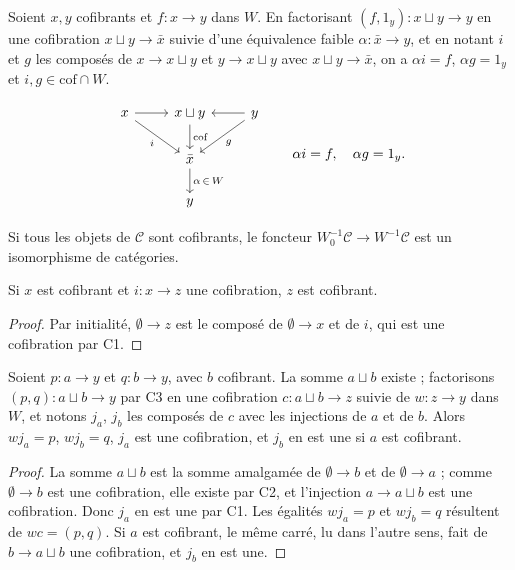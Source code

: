\begin{enonce}
Soient $x, y$ cofibrants et $f : x \to y$ dans $W$. En factorisant $(f, 1_y) : x \sqcup y \to y$ en une cofibration $x \sqcup y \to \bar x$ suivie d'une équivalence faible $\alpha : \bar x \to y$, et en notant $i$ et $g$ les composés de $x \to x \sqcup y$ et $y \to x \sqcup y$ avec $x \sqcup y \to \bar x$, on a $\alpha i = f$, $\alpha g = 1_y$ et $i, g \in \mathrm{cof} \cap W$.
\end{enonce}

\[
\begin{tikzcd}
x \arrow[r] \arrow[rd, "i"'] & x \sqcup y \arrow[d, "\mathrm{cof}"] & y \arrow[l] \arrow[ld, "g"] \\
& \bar x \arrow[d, "\alpha\, \in\, W"] & \\
& y &
\end{tikzcd}
\qquad \alpha i = f, \quad \alpha g = 1_y.
\]

\begin{enonce}
Si tous les objets de $\mathcal C$ sont cofibrants, le foncteur $W_0^{-1}\mathcal C \to W^{-1}\mathcal C$ est un isomorphisme de catégories.
\end{enonce}

\begin{lemme}\label{lem:106-cof}
Si $x$ est cofibrant et $i : x \to z$ une cofibration, $z$ est cofibrant.
\end{lemme}

\begin{proof}
Par initialité, $\emptyset \to z$ est le composé de $\emptyset \to x$ et de $i$, qui est une cofibration par C1.
\end{proof}

\begin{lemme}\label{lem:106-somme}
Soient $p : a \to y$ et $q : b \to y$, avec $b$ cofibrant. La somme $a \sqcup b$ existe ; factorisons $(p, q) : a \sqcup b \to y$ par C3 en une cofibration $c : a \sqcup b \to z$ suivie de $w : z \to y$ dans $W$, et notons $j_a$, $j_b$ les composés de $c$ avec les injections de $a$ et de $b$. Alors $w j_a = p$, $w j_b = q$, $j_a$ est une cofibration, et $j_b$ en est une si $a$ est cofibrant.
\end{lemme}

\begin{proof}
La somme $a \sqcup b$ est la somme amalgamée de $\emptyset \to b$ et de $\emptyset \to a$ ; comme $\emptyset \to b$ est une cofibration, elle existe par C2, et l'injection $a \to a \sqcup b$ est une cofibration. Donc $j_a$ en est une par C1. Les égalités $w j_a = p$ et $w j_b = q$ résultent de $wc = (p, q)$. Si $a$ est cofibrant, le même carré, lu dans l'autre sens, fait de $b \to a \sqcup b$ une cofibration, et $j_b$ en est une.
\end{proof}

